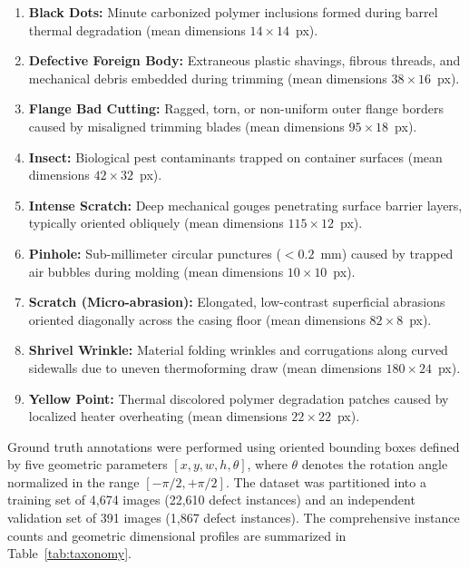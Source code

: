 \begin{enumerate}
\item \textbf{Black Dots:} Minute carbonized polymer inclusions formed during barrel thermal degradation (mean dimensions $14 \times 14$~px).
\item \textbf{Defective Foreign Body:} Extraneous plastic shavings, fibrous threads, and mechanical debris embedded during trimming (mean dimensions $38 \times 16$~px).
\item \textbf{Flange Bad Cutting:} Ragged, torn, or non-uniform outer flange borders caused by misaligned trimming blades (mean dimensions $95 \times 18$~px).
\item \textbf{Insect:} Biological pest contaminants trapped on container surfaces (mean dimensions $42 \times 32$~px).
\item \textbf{Intense Scratch:} Deep mechanical gouges penetrating surface barrier layers, typically oriented obliquely (mean dimensions $115 \times 12$~px).
\item \textbf{Pinhole:} Sub-millimeter circular punctures ($<0.2$~mm) caused by trapped air bubbles during molding (mean dimensions $10 \times 10$~px).
\item \textbf{Scratch (Micro-abrasion):} Elongated, low-contrast superficial abrasions oriented diagonally across the casing floor (mean dimensions $82 \times 8$~px).
\item \textbf{Shrivel Wrinkle:} Material folding wrinkles and corrugations along curved sidewalls due to uneven thermoforming draw (mean dimensions $180 \times 24$~px).
\item \textbf{Yellow Point:} Thermal discolored polymer degradation patches caused by localized heater overheating (mean dimensions $22 \times 22$~px).
\end{enumerate}

Ground truth annotations were performed using oriented bounding boxes defined by five geometric parameters $[x, y, w, h, \theta]$, where $\theta$ denotes the rotation angle normalized in the range $[-\pi/2, +\pi/2]$. The dataset was partitioned into a training set of 4,674 images (22,610 defect instances) and an independent validation set of 391 images (1,867 defect instances). The comprehensive instance counts and geometric dimensional profiles are summarized in Table~\ref{tab:taxonomy}.

